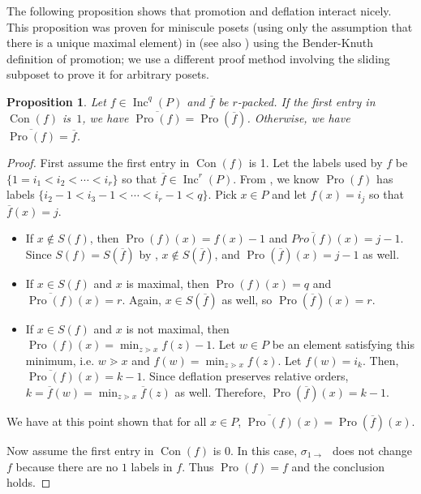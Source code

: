 \documentclass[11pt]{amsart}
\newtheorem{proposition}[theorem]{Proposition}
\theoremstyle{definition}
\DeclareMathOperator{\boxempty}{\boxed{ }}
\DeclareMathOperator{\Inc}{\mathrm{Inc}}
\DeclareMathOperator{\Pro}{\mathrm{Pro}}
\DeclareMathOperator{\Con}{\mathrm{Con}}
\begin{document}
The following proposition shows that promotion and deflation interact nicely.  This proposition was proven for miniscule posets (using only the assumption that there is a unique maximal element) in \cite[Proposition 5.1]{mandel2018orbits} (see also \cite[Sec.~3]{Pechenik22}) using the Bender-Knuth definition of promotion; we use a different proof method involving the sliding subposet to prove it for arbitrary posets. 

\begin{proposition}\label{prop:ProRestricts}
Let $f \in \Inc^q(P)$ and $\overline{f}$ be $r$-packed. If the first entry in $\Con(f)$ is~$1$, we have $\overline{\Pro(f)} = \Pro(\overline{f})$. Otherwise, we have $\overline{\Pro(f)} = \overline{f}$.
\end{proposition}

\begin{proof}


    First assume the first entry in $\Con(f)$ is 1. Let the labels used by $f$ be $\{1 = i_1 < i_2 < \cdots < i_r\}$ so that $\overline{f} \in \Inc^r(P)$. From , we know $\Pro(f)$ has labels $\{i_2-1 < i_3 -1 < \cdots < i_r -1 < q\}$.    
    Pick $x \in P$ and let $f(x) = i_j$ so that $\overline{f}(x) = j$.
    \begin{itemize}
        \item If $x \notin S(f)$, then $\Pro(f)(x) = f(x) - 1$ and $\overline{Pro(f)}(x) = j-1$. Since $S(f) = S(\overline{f})$ by , $x \notin S(\overline{f})$, and $\Pro(\overline{f})(x) = j-1$ as well.  
        \item If $x \in S(f)$ and $x$ is maximal, then $\Pro(f)(x) = q$ and $\overline{\Pro(f)}(x) = r$. Again, $x \in S(\overline{f})$ as well, so $\Pro(\overline{f})(x) = r$.
        \item If $x \in S(f)$ and $x$ is not maximal, then $\Pro(f)(x) = \min_{z \gtrdot x} f(z) - 1$. Let $w \in P$ be an element satisfying this minimum, i.e. $w \gtrdot x$ and $f(w) = \min_{z \gtrdot x}f(z)$. Let $f(w) = i_k$. Then, $\overline{\Pro(f)}(x) = k-1$. Since deflation preserves relative orders, $k = \overline{f}(w) = \min_{z \gtrdot x}\overline{f}(z)$ as well. Therefore, $\Pro(\overline{f})(x) = k-1$.
    \end{itemize}
    We have at this point shown that for all $x \in P$, $\overline{\Pro(f)}(x) = \Pro(\overline{f})(x)$.

        Now assume the first entry in $\Con(f)$ is 0.  In this case, $\sigma_{1\to\boxempty}$ does not change $f$ because there are no $1$ labels in $f$.  Thus $\Pro(f)=f$ and the conclusion holds.
\end{proof}
\end{document}
